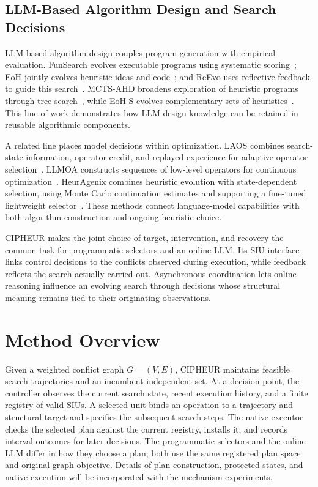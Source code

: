 \documentclass[sigconf,anonymous]{aamas}
\begin{document}
\subsection{LLM-Based Algorithm Design and Search Decisions}

LLM-based algorithm design couples program generation with empirical evaluation. FunSearch evolves executable programs using systematic scoring~\cite{romeraparedes2024funsearch}; EoH jointly evolves heuristic ideas and code~\cite{liu2024eoh}; and ReEvo uses reflective feedback to guide this search~\cite{ye2024reevo}. MCTS-AHD broadens exploration of heuristic programs through tree search~\cite{zheng2025mctsahd}, while EoH-S evolves complementary sets of heuristics~\cite{liu2026eohs}. This line of work demonstrates how LLM design knowledge can be retained in reusable algorithmic components.

A related line places model decisions within optimization. LAOS combines search-state information, operator credit, and replayed experience for adaptive operator selection~\cite{zhang2025laos}. LLMOA constructs sequences of low-level operators for continuous optimization~\cite{zhong2025llmoa}. HeurAgenix combines heuristic evolution with state-dependent selection, using Monte Carlo continuation estimates and supporting a fine-tuned lightweight selector~\cite{yang2025heuragenix}. These methods connect language-model capabilities with both algorithm construction and ongoing heuristic choice.

CIPHEUR makes the joint choice of target, intervention, and recovery the common task for programmatic selectors and an online LLM. Its SIU interface links control decisions to the conflicts observed during execution, while feedback reflects the search actually carried out. Asynchronous coordination lets online reasoning influence an evolving search through decisions whose structural meaning remains tied to their originating observations.

\section{Method Overview}

Given a weighted conflict graph $G=(V,E)$, CIPHEUR maintains feasible search trajectories and an incumbent independent set. At a decision point, the controller observes the current search state, recent execution history, and a finite registry of valid SIUs. A selected unit binds an operation to a trajectory and structural target and specifies the subsequent search steps. The native executor checks the selected plan against the current registry, installs it, and records interval outcomes for later decisions. The programmatic selectors and the online LLM differ in how they choose a plan; both use the same registered plan space and original graph objective. Details of plan construction, protected states, and native execution will be incorporated with the mechanism experiments.
\end{document}
